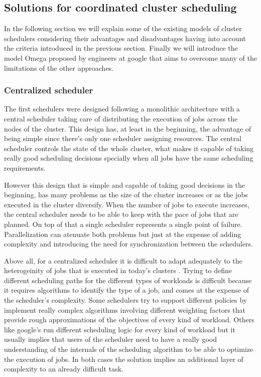 \documentclass{svjour3}                     %
\begin{document}
\subsection{Solutions for coordinated cluster scheduling}

In the following section we will explain some of the existing models
of cluster schedulers considering their advantages and disadvantages
having into account the criteria introduced in the previous
section. Finally we will introduce the model Omega \cite{41684}
proposed by engineers at google that aims to overcome many of the
limitations of the other approaches.

\subsubsection{Centralized scheduler}

The first schedulers were designed following a monolithic architecture
with a central scheduler taking care of distributing the execution
of jobs across the nodes of the cluster. This design has, at least in
the beginning, the advantage of being simple since there's only one
scheduler assigning resources. The central scheduler controls the
state of the whole cluster, what makes it capable of taking really
good scheduling decisions specially when all jobs have the same
scheduling requirements. 

However this design that is simple and capable of taking good
decisions in the beginning, has many problems as the size of the
cluster increases or as the jobs executed in the cluster
diversify. When the number of jobs to execute increases, the central
scheduler needs to be able to keep with the pace of jobs that are
planned. On top of that a single scheduler represents a single point
of failure. Parallelization can atenuate both problems but just at the
expense of adding complexity and introducing the need for synchronization
between the schedulers.

Above all, for a centralized scheduler it is difficult to adapt
adequately to the heterogeinity of jobs that is executed in today's
clusters \cite{37201}. Trying to define different
scheduling paths for the different types of workloads is difficult
because it requires algorithms to identify the type of a job, and comes
at the expense of the scheduler's complexity. Some schedulers try to
support different policies by implement really complex algorithms
involving different weighting factors that provide rough
approximations of the objectives of every kind of workload. Others
like google's run different scheduling logic for every kind of
workload but it usually implies that users of the scheduler need to
have a really good understanding of the internals of the scheduling
algorithm to be able to optimize the execution of jobs. In both cases
the solution implies an additional layer of complexity to an already
difficult task.
\end{document}
